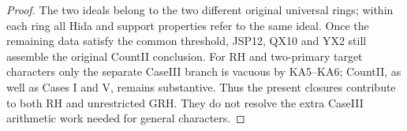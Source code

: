 \begin{proof}
The two ideals belong to the two different original universal
rings; within each ring all Hida and support properties refer to
the same ideal.  Once the remaining data satisfy the common
threshold, JSP12, QX10 and YX2 still assemble the original CountII
conclusion.  For RH and two-primary target characters only the
separate CaseIII branch is vacuous by KA5--KA6; CountII, as well as
Cases I and V, remains substantive.  Thus the present closures
contribute to both RH and unrestricted GRH.  They do not resolve
the extra CaseIII arithmetic work needed for general characters.
\end{proof}
